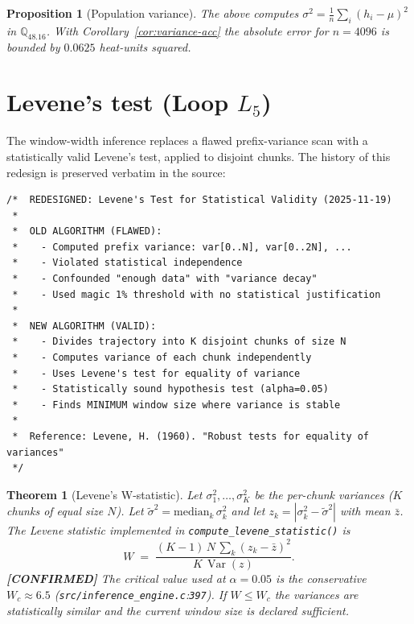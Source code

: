 \documentclass[11pt,letterpaper,openany]{book}
\theoremstyle{definition}
\theoremstyle{plain}
\newtheorem{theorem}[definition]{Theorem}
\newtheorem{proposition}[definition]{Proposition}
\newcommand{\confirmed}{\textcolor{green!50!black}{\textbf{[CONFIRMED]}}\xspace}
\newcommand{\Qfp}{\mathbb{Q}_{48.16}}                %
\newcommand{\Var}{\operatorname{Var}}
\newcommand{\Loop}[1]{L_{#1}}
\newcommand{\sourceref}[2]{\texttt{#1}:\texttt{#2}}
\begin{document}
\begin{proposition}[Population variance]
The above computes $\sigma^2 = \tfrac{1}{n}\sum_i (h_i-\mu)^2$ in $\Qfp$.
With Corollary~\ref{cor:variance-acc} the absolute error for $n=4096$ is
bounded by $0.0625$ heat-units squared.
\end{proposition}

\section{Levene's test (Loop \texorpdfstring{$\Loop{5}$}{L5})}
\label{sec:levene}

The window-width inference replaces a flawed prefix-variance scan with a
statistically valid Levene's test, applied to disjoint chunks. The history
of this redesign is preserved verbatim in the source:

\begin{lstlisting}[caption={History of the redesign
  (\texttt{src/inference\_engine.c}:357--376).}]
/*  REDESIGNED: Levene's Test for Statistical Validity (2025-11-19)
 *
 *  OLD ALGORITHM (FLAWED):
 *    - Computed prefix variance: var[0..N], var[0..2N], ...
 *    - Violated statistical independence
 *    - Confounded "enough data" with "variance decay"
 *    - Used magic 1% threshold with no statistical justification
 *
 *  NEW ALGORITHM (VALID):
 *    - Divides trajectory into K disjoint chunks of size N
 *    - Computes variance of each chunk independently
 *    - Uses Levene's test for equality of variance
 *    - Statistically sound hypothesis test (alpha=0.05)
 *    - Finds MINIMUM window size where variance is stable
 *
 *  Reference: Levene, H. (1960). "Robust tests for equality of variances"
 */
\end{lstlisting}

\begin{theorem}[Levene's W-statistic]\label{thm:levene}
Let $\sigma^2_1,\dots,\sigma^2_K$ be the per-chunk variances ($K$ chunks
of equal size $N$). Let $\tilde\sigma^2 = \mathrm{median}_k\,\sigma^2_k$ and
let $z_k = |\sigma^2_k - \tilde\sigma^2|$ with mean $\bar z$. The
Levene statistic implemented in
\texttt{compute\_levene\_statistic()} is
\begin{equation}\label{eq:levene}
  W \;=\; \frac{(K-1)\,N\,\sum_k (z_k-\bar z)^2}{K\,\Var(z)}.
\end{equation}
\confirmed The critical value used at $\alpha = 0.05$ is the conservative
$W_c \approx 6.5$ (\sourceref{src/inference\_engine.c}{397}). If $W \le W_c$
the variances are statistically similar and the current window size is
declared sufficient.
\end{theorem}
\end{document}
